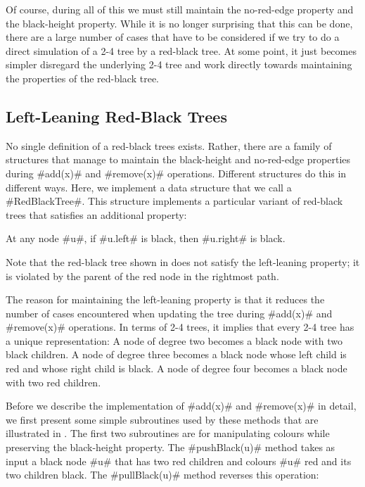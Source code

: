 Of course, during all of this we must still maintain the no-red-edge
property and the black-height property.  While it is no longer surprising
that this can be done, there are a large number of cases that have to
be considered if we try to do a direct simulation of a 2-4 tree by a
red-black tree.  At some point, it just becomes simpler disregard the
underlying 2-4 tree and work directly towards maintaining the properties
of the red-black tree.

\subsection{Left-Leaning Red-Black Trees}

No single definition of a red-black trees exists.  Rather, there are
a family of structures that manage to maintain the black-height
and no-red-edge properties during #add(x)# and #remove(x)#
operations. Different structures do this in different ways.
Here, we implement a data structure that we call a #RedBlackTree#.
This structure implements a particular variant of red-black trees that
satisfies an additional property:
\begin{prp}
  At any node #u#, if #u.left# is black, then #u.right# is black.
\end{prp}
Note that the red-black tree shown in   does
not satisfy the left-leaning property;  it is violated by the parent of
the red node in the rightmost path.

The reason for maintaining the left-leaning property is that it reduces
the number of cases encountered when updating the tree during #add(x)#
and #remove(x)# operations.  In terms of 2-4 trees, it implies that every
2-4 tree has a unique representation:  A node of degree two becomes
a black node with two black children.  A node of degree three becomes
a black node whose left child is red and whose right child is black.
A node of degree four becomes a black node with two red children.

Before we describe the implementation of #add(x)# and #remove(x)# in
detail, we first present some simple subroutines used by these methods
that are illustrated in .  The first two
subroutines are for manipulating colours while preserving the black-height
property. The #pushBlack(u)# method takes as input a black node #u#
that has two red children and colours #u# red and its two children black.
The #pullBlack(u)# method reverses this operation:


